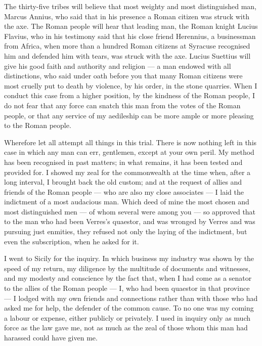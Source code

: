  The thirty-five tribes will believe that most weighty and most distinguished man, Marcus Annius, who said that in his presence a Roman citizen was struck with the axe. The Roman people will hear that leading man, the Roman knight Lucius Flavius, who in his testimony said that his close friend Herennius, a businessman from Africa, when more than a hundred Roman citizens at Syracuse recognised him and defended him with tears, was struck with the axe. Lucius Suettius will give his good faith and authority and religion --- a man endowed with all distinctions, who said under oath before you that many Roman citizens were most cruelly put to death by violence, by his order, in the stone quarries. When I conduct this case from a higher position, by the kindness of the Roman people, I do not fear that any force can snatch this man from the votes of the Roman people, or that any service of my aedileship can be more ample or more pleasing to the Roman people.

 Wherefore let all attempt all things in this trial. There is now nothing left in this case in which any man can err, gentlemen, except at your own peril. My method has been recognised in past matters; in what remains, it has been tested and provided for. I showed my zeal for the commonwealth at the time when, after a long interval, I brought back the old custom; and at the request of allies and friends of the Roman people --- who are also my close associates --- I laid the indictment of a most audacious man. Which deed of mine the most chosen and most distinguished men --- of whom several were among you --- so approved that to the man who had been Verres's quaestor, and was wronged by Verres and was pursuing just enmities, they refused not only the laying of the indictment, but even the subscription, when he asked for it.

 I went to Sicily for the inquiry. In which business my industry was shown by the speed of my return, my diligence by the multitude of documents and witnesses, and my modesty and conscience by the fact that, when I had come as a senator to the allies of the Roman people --- I, who had been quaestor in that province --- I lodged with my own friends and connections rather than with those who had asked me for help, the defender of the common cause. To no one was my coming a labour or expense, either publicly or privately. I used in inquiry only as much force as the law gave me, not as much as the zeal of those whom this man had harassed could have given me.

